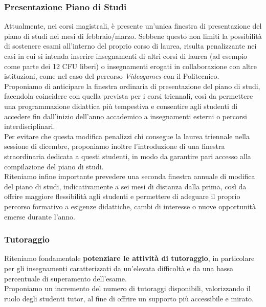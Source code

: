 \documentclass[12pt,a4paper]{article}
\begin{document}
\subsubsection{Presentazione Piano di Studi}
Attualmente, nei corsi magistrali, è presente un’unica finestra di presentazione del piano di studi nei mesi di febbraio/marzo. Sebbene questo non limiti la possibilità di sostenere esami all’interno del proprio corso di laurea, risulta penalizzante nei casi in cui si intenda inserire insegnamenti di altri corsi di laurea (ad esempio come parte dei 12 CFU liberi) o insegnamenti erogati in collaborazione con altre istituzioni, come nel caso del percorso \textit{Videogames} con il Politecnico.
\\ Proponiamo di anticipare la finestra ordinaria di presentazione del piano di studi, facendola coincidere con quella prevista per i corsi triennali, così da permettere una programmazione didattica più tempestiva e consentire agli studenti di accedere fin dall’inizio dell’anno accademico a insegnamenti esterni o percorsi interdisciplinari.
\\ Per evitare che questa modifica penalizzi chi consegue la laurea triennale nella sessione di dicembre, proponiamo inoltre l’introduzione di una finestra straordinaria dedicata a questi studenti, in modo da garantire pari accesso alla compilazione del piano di studi.
\\ Riteniamo infine importante prevedere una seconda finestra annuale di modifica del piano di studi, indicativamente a sei mesi di distanza dalla prima, così da offrire maggiore flessibilità agli studenti e permettere di adeguare il proprio percorso formativo a esigenze didattiche, cambi di interesse o nuove opportunità emerse durante l’anno.

\subsubsection{Tutoraggio}
Riteniamo fondamentale \textbf{potenziare le attività di tutoraggio}, in particolare per gli insegnamenti caratterizzati da un'elevata difficoltà e da una bassa percentuale di superamento dell'esame.
\\ Proponiamo un incremento del numero di tutoraggi disponibili, valorizzando il ruolo degli studenti tutor, al fine di offrire un supporto più accessibile e mirato.
\end{document}
